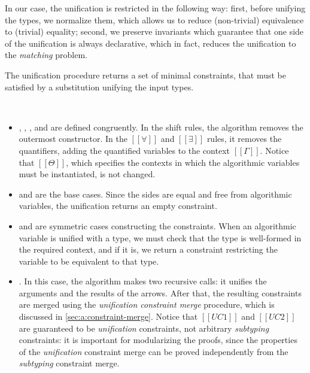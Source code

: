 In our case, the unification is restricted in the following way:
first, before unifying the types, we normalize them, which 
allows us to reduce (non-trivial) equivalence to (trivial) equality;
second, we preserve invariants which guarantee that
one side of the unification is always declarative, which in fact, 
reduces the unification to the \emph{matching} problem.

The unification procedure
returns a set of minimal constraints,
that must be satisfied by a substitution
unifying the input types.

\begin{algorithm}[Unification]
  \hfill
  \begin{multicols}{2}
  \ottdefnUNUnifLabeled[\apppref]{}
  \columnbreak\\
  \ottdefnUPUnifLabeled[\apppref]{}
  \end{multicols}
\end{algorithm}


\begin{itemize}
  \item {}, , 
    , and 
    are defined congruently. In the shift rules, the algorithm
    removes the outermost constructor. In the
    $[[∀]]$ and $[[∃]]$ rules, it removes the quantifiers,
    adding the quantified variables to the context $[[Γ]]$.
    Notice that $[[Θ]]$, which specifies
    the contexts in which the algorithmic variables must be instantiated,
    is not changed.
  \item {} and  
    are the base cases. 
    Since the sides are equal and free from algorithmic variables,
    the unification returns an empty constraint. 
  \item {} and 
    are symmetric cases constructing the constraints. 
    When an algorithmic variable is unified with a type, 
    we must check that the type is well-formed in the required context,
    and if it is, we return a constraint restricting the variable
    to be equivalent to that type.
  \item {}.
    In this case, the algorithm makes two recursive calls:
    it unifies the arguments and the results of the arrows.
    After that, the resulting constraints are merged using the
    \emph{unification constraint merge} procedure, 
    which is discussed in \cref{sec:a:constraint-merge}.
    Notice that $[[UC1]]$ and $[[UC2]]$ are guaranteed to be
    \emph{unification} constraints, not arbitrary \emph{subtyping} 
    constraints: it is important for modularizing the proofs, 
    since the properties of the \emph{unification} constraint merge
    can be proved independently from the \emph{subtyping} constraint merge.
\end{itemize}


